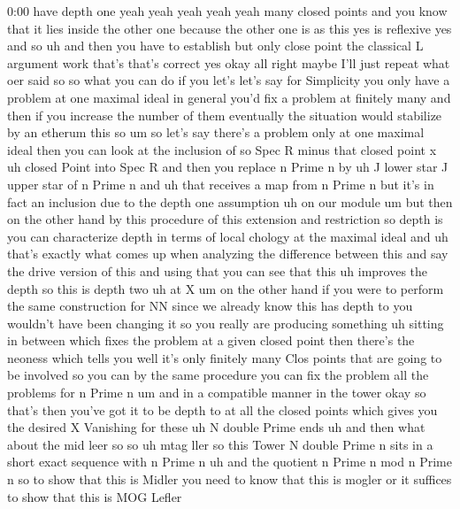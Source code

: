\begin{unfinished}{0:00}
have  depth
one
yeah  yeah
yeah  yeah  yeah  many  closed  points  and
you  know  that  it  lies  inside  the  other
one  because  the  other  one  is  as  this  yes
is  reflexive
yes  and  so  uh  and  then  you  have  to
establish  but  only  close  point  the
classical  L  argument  work  that's  that's
correct
yes
okay  all
right  maybe  I'll  just  repeat  what  oer
said
so  so  what  you  can  do  if  you  let's  let's
say  for  Simplicity  you  only  have  a
problem  at  one  maximal  ideal  in  general
you'd  fix  a  problem  at  finitely  many  and
then  if  you  increase  the  number  of  them
eventually  the  situation  would  stabilize
by  an  etherum  this  so  um  so  let's  say
there's  a  problem  only  at  one  maximal
ideal  then  you  can  look  at  the  inclusion
of  so  Spec  R  minus  that  closed  point  x
uh  closed
Point  into  Spec  R  and  then  you
replace
n  Prime  n  by  uh  J  lower  star  J  upper
star  of  n  Prime
n  and
uh  that  receives  a  map  from  n  Prime  n
but  it's  in  fact  an  inclusion  due  to  the
depth  one  assumption  uh  on  our
module  um  but  then  on  the  other  hand  by
this  procedure  of  this  extension  and
restriction  so  depth  is  you  can
characterize  depth  in  terms  of  local
chology  at  the  maximal  ideal  and  uh
that's  exactly  what  comes  up  when
analyzing  the  difference  between  this
and  say  the  drive  version  of  this  and
using  that  you  can  see  that  this  uh
improves  the  depth  so  this  is  depth
two  uh  at
X  um  on  the  other  hand  if  you  were  to
perform  the  same  construction  for  NN
since  we  already  know  this  has  depth  to
you  wouldn't  have  been  changing  it  so
you  really  are  producing  something  uh
sitting  in  between  which  fixes  the
problem  at  a  given  closed  point  then
there's  the  neoness  which  tells  you  well
it's  only  finitely  many  Clos  points  that
are  going  to  be  involved  so  you  can  by
the  same  procedure  you  can  fix  the
problem  all  the  problems  for  n  Prime  n
um  and  in  a  compatible  manner  in  the
tower  okay  so  that's  then  you've  got  it
to  be  depth  to  at  all  the  closed  points
which  gives  you  the  desired  X  Vanishing
for  these  uh  N  double  Prime
ends  uh  and  then  what  about  the  mid
leer
so
so  uh  mtag  ller
so  this  Tower  N  double  Prime  n  sits  in  a
short  exact  sequence  with  n  Prime
n  uh  and  the  quotient  n  Prime  n  mod  n
Prime
n  so  to  show  that  this  is  Midler  you
need  to  know  that  this  is  mogler  or  it
suffices  to  show  that  this  is  MOG  Lefler

\end{unfinished}
